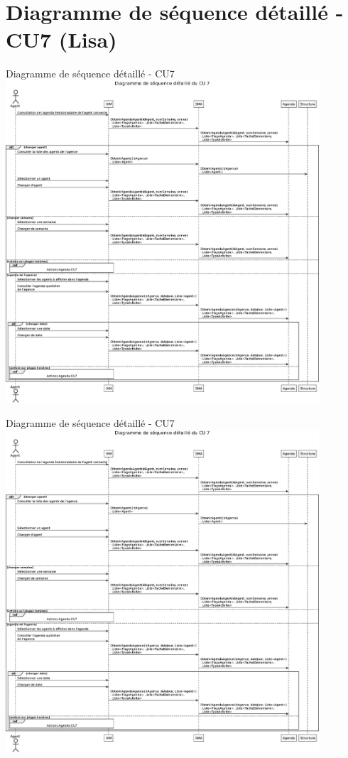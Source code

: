 \documentclass[xetex]{beamer}
\begin{document}
    \section{Diagramme de séquence détaillé - CU7 (Lisa)}
    \begin{frame}{Diagramme de séquence détaillé - CU7}
  {\includegraphics[height=12cm]{../report/figures/eps/DSD_CU7}}
    \end{frame}
    
    
        \begin{frame}{Diagramme de séquence détaillé - CU7}
  {\includegraphics[height=12cm]{../report/figures/eps/DSD_CU7}}
    \end{frame}
    
\end{document}
